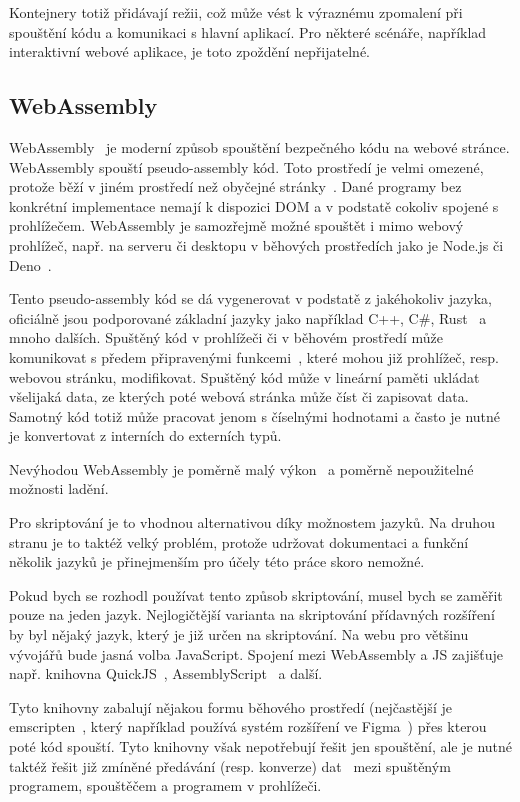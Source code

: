 Kontejnery totiž přidávají režii, což může vést k výraznému zpomalení při spouštění kódu a komunikaci s hlavní aplikací. 
Pro některé scénáře, například interaktivní webové aplikace, je toto zpoždění nepřijatelné.

\subsection{WebAssembly}\label{text:webassembly}

WebAssembly~\cite{webassembly} je moderní způsob spouštění bezpečného kódu na webové stránce.
WebAssembly spouští pseudo-assembly kód.
Toto prostředí je velmi omezené, protože běží v jiném prostředí než obyčejné stránky~\cite{webassembly, figma_plugins_blog}.
Dané programy bez konkrétní implementace nemají k dispozici DOM a v podstatě cokoliv spojené s prohlížečem.
WebAssembly je samozřejmě možné spouštět i mimo webový prohlížeč, např. na serveru či desktopu v běhových prostředích jako je Node.js či Deno~\cite{webassembly}.

Tento pseudo-assembly kód se dá vygenerovat v podstatě z jakéhokoliv jazyka, oficiálně jsou podporované základní jazyky jako například C++, C\#, Rust~\cite{webassembly} a mnoho dalších.
Spuštěný kód v prohlížeči či v běhovém prostředí může komunikovat s předem připravenými funkcemi~\cite{webassembly}, které mohou již prohlížeč, resp. webovou stránku, modifikovat.
Spuštěný kód může v lineární paměti ukládat všelijaká data, ze kterých poté webová stránka může číst či zapisovat data.
Samotný kód totiž může pracovat jenom s číselnými hodnotami a často je nutné je konvertovat z interních do externích typů.

Nevýhodou WebAssembly je poměrně malý výkon~\cite{webassembly, figma_plugins_blog} a poměrně nepoužitelné možnosti ladění.

Pro skriptování je to vhodnou alternativou díky možnostem jazyků. 
Na druhou stranu je to taktéž velký problém, protože udržovat dokumentaci a funkční několik jazyků je přinejmenším pro účely této práce skoro nemožné.

Pokud bych se rozhodl používat tento způsob skriptování, musel bych se zaměřit pouze na jeden jazyk.
Nejlogičtější varianta na skriptování přídavných rozšíření by byl nějaký jazyk, který je již určen na skriptování.
Na webu pro většinu vývojářů bude jasná volba JavaScript.
Spojení mezi WebAssembly a JS zajišťuje např. knihovna QuickJS~\cite{quickjs}, AssemblyScript~\cite{assemblyscript} a další.

Tyto knihovny zabalují nějakou formu běhového prostředí (nejčastější je emscripten~\cite{assemblyscript, quickjs, figma_plugins_blog}, který například používá systém rozšíření ve Figma~\cite{figma_plugins_blog}) přes kterou poté kód spouští.
Tyto knihovny však nepotřebují řešit jen spouštění, ale je nutné taktéž řešit již zmíněné předávání (resp. konverze) dat~\cite{assemblyscript} mezi spuštěným programem, spouštěčem a programem v prohlížeči.

